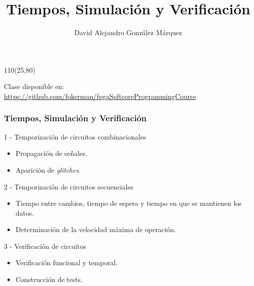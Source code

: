 \documentclass[aspectratio=169]{beamer}
\title{\Huge Tiempos, Simulación y Verificación}
\author{David Alejandro González Márquez}
\date{}
\begin{document}
\begin{frame}[plain]
    \titlepage
    \begin{textblock}{110}(25,80)
    \begin{tcolorbox}[size=small,width=\textwidth,colback={gray!30},title={}]
    \begin{center}
     \scriptsize Clase disponible en: \url{https://github.com/fokerman/fpgaSoftcoreProgrammingCourse}
    \end{center}
    \end{tcolorbox}
    \end{textblock}
\end{frame}

\begin{frame}[fragile]
    \frametitle{Tiempos, Simulación y Verificación} 
    \textcolor{naranjauca}{1 - Temporización de circuitos combinacionales}
    \begin{itemize}
     \item Propagación de señales.
     \item Aparición de \emph{glitches}.
    \end{itemize}
    \bigskip
    \textcolor{naranjauca}{2 - Temporización de circuitos secuenciales}
    \begin{itemize}
     \item Tiempo entre cambios, tiempo de espera y tiempo en que se mantienen los datos.
     \item Determinación de la velocidad máxima de operación.
    \end{itemize}
    \bigskip
    \textcolor{naranjauca}{3 - Verificación de circuitos}
    \begin{itemize}
     \item Verificación funcional y temporal.
     \item Construcción de tests.
    \end{itemize}
\end{frame}
\end{document}
